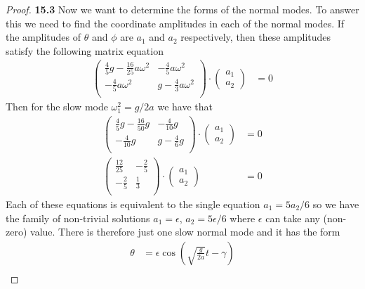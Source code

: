 \documentclass[11pt]{article}
\theoremstyle{definition}
\begin{document}
\begin{proof}{\textbf{15.3}}
    Now we want to determine the forms of the normal modes.
    To answer this we need to ﬁnd the coordinate amplitudes in each of
    the normal modes.
    If the amplitudes of $\theta$ and $\phi$ are $a_1$ and $a_2$ respectively,
    then these amplitudes satisfy the following matrix equation
    \begin{align*}
        \begin{pmatrix}
            \frac{4}{5}g -\frac{16}{25}a\omega^2 & -\frac{4}{5}a\omega^2\\
            -\frac{4}{5}a\omega^2 & g -\frac{4}{3}a\omega^2\\
        \end{pmatrix}\cdot
        \begin{pmatrix}
            a_1\\ a_2
        \end{pmatrix}
        &= 0
    \end{align*}    
    Then for the slow mode $\omega_1^2 = g/2a$ we have that
    \begin{align*}
        \begin{pmatrix}
            \frac{4}{5}g -\frac{16}{50}g & -\frac{4}{10}g\\
            -\frac{4}{10}g & g -\frac{4}{6}g\\
        \end{pmatrix}\cdot
        \begin{pmatrix}
            a_1\\ a_2
        \end{pmatrix}
        &= 0\\
        \begin{pmatrix}
            \frac{12}{25} & -\frac{2}{5}\\
            -\frac{2}{5} & \frac{1}{3}\\
        \end{pmatrix}\cdot
        \begin{pmatrix}
            a_1\\ a_2
        \end{pmatrix}
        &= 0
    \end{align*}
    Each of these equations is equivalent to the single equation $a_1 = 5a_2/6$
    so we have the family of non-trivial solutions $a_1 = \epsilon$,
    $a_2 = 5\epsilon/6$ where $\epsilon$ can take any (non-zero) value.
    There is therefore just one slow normal mode and it has the form
    \begin{align*}
        \theta &= \epsilon \cos(\sqrt{\frac{g}{2a}}t - \gamma)\\

\end{align*}
\end{proof}
\end{document}
